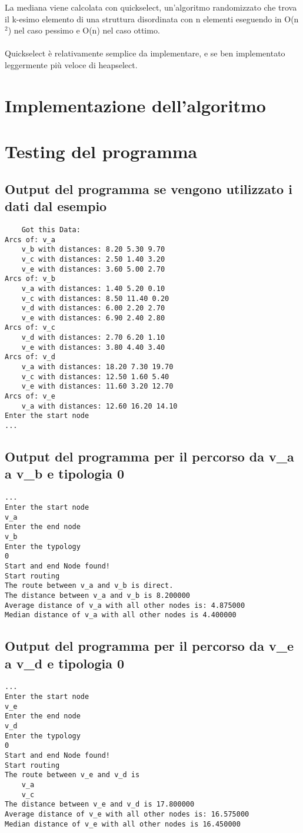 \documentclass[11pt, a4paper, titlepage, block]{article}
\begin{document}
	La mediana viene calcolata con quickselect, un'algoritmo randomizzato che trova il k-esimo elemento di una struttura disordinata con n elementi eseguendo in O(n$^2$) nel caso pessimo e O(n) nel caso ottimo.\\\\ 

	Quickselect \`{e} relativamente semplice da implementare, e se ben implementato leggermente pi\`{u} veloce di heapselect.\\
	\newpage
\section{Implementazione dell'algoritmo}
	\newpage
\section{Testing del programma}
	\subsection{Output del programma se vengono utilizzato i dati dal esempio}
	\begin{lstlisting}
	Got this Data:
Arcs of: v_a
	v_b with distances: 8.20 5.30 9.70
	v_c with distances: 2.50 1.40 3.20
	v_e with distances: 3.60 5.00 2.70
Arcs of: v_b
	v_a with distances: 1.40 5.20 0.10
	v_c with distances: 8.50 11.40 0.20
	v_d with distances: 6.00 2.20 2.70
	v_e with distances: 6.90 2.40 2.80
Arcs of: v_c
	v_d with distances: 2.70 6.20 1.10
	v_e with distances: 3.80 4.40 3.40
Arcs of: v_d
	v_a with distances: 18.20 7.30 19.70
	v_c with distances: 12.50 1.60 5.40
	v_e with distances: 11.60 3.20 12.70
Arcs of: v_e
	v_a with distances: 12.60 16.20 14.10
Enter the start node
...
	\end{lstlisting}
	\subsection{Output del programma per il percorso da v\_a a v\_b e tipologia 0}
	\begin{lstlisting}
...
Enter the start node
v_a
Enter the end node
v_b
Enter the typology
0
Start and end Node found!
Start routing
The route between v_a and v_b is direct.
The distance between v_a and v_b is 8.200000
Average distance of v_a with all other nodes is: 4.875000
Median distance of v_a with all other nodes is 4.400000
	\end{lstlisting}
	\subsection{Output del programma per il percorso da v\_e a v\_d e tipologia 0}
	\begin{lstlisting}
...
Enter the start node
v_e
Enter the end node
v_d
Enter the typology
0
Start and end Node found!
Start routing
The route between v_e and v_d is
	v_a
	v_c
The distance between v_e and v_d is 17.800000
Average distance of v_e with all other nodes is: 16.575000
Median distance of v_e with all other nodes is 16.450000
	\end{lstlisting}
	\newpage
\end{document}
